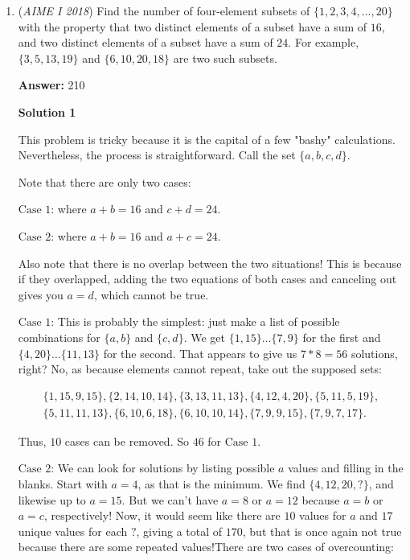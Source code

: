 \begin{enumerate}
 Solving this equation gives $d=7\sqrt{3}$, and $d^2=\boxed{147}$



	\item (\textit{AIME I 2018}) Find the number of four-element subsets of $\{1,2,3,4,\dots, 20\}$ with the property that two distinct elements of a subset have a sum of $16$, and two distinct elements of a subset have a sum of $24$. For example, $\{3,5,13,19\}$ and $\{6,10,20,18\}$ are two such subsets.


 
 \textbf{Answer: }210



\textbf{Solution 1}

This problem is tricky because it is the capital of a few "bashy" calculations. Nevertheless, the process is straightforward. Call the set $\{a, b, c, d\}$.

 Note that there are only two cases:

 $\textrm{Case } 1 \textrm{:}$ where $a + b = 16$ and $c + d = 24$.

 $\textrm{Case } 2 \textrm{:}$ where $a + b = 16$ and $a + c = 24$.

 Also note that there is no overlap between the two situations! This is because if they overlapped, adding the two equations of both cases and canceling out gives you $a=d$, which cannot be true.

 $\textrm{Case } 1 \textrm{:}$ This is probably the simplest: just make a list of possible combinations for $\{a, b\}$ and $\{c, d\}$. We get $\{1, 15\}\dots\{7, 9\}$ for the first and $\{4, 20\}\dots\{11, 13\}$ for the second. That appears to give us $7*8=56$ solutions, right? No, as because elements cannot repeat, take out the supposed sets:

 
 \[\begin{array}{l} \{1,15,9,15\}, \{2,14,10,14\}, \{3,13,11,13\}, \{4,12,4,20\}, \{5,11,5,19\},\\ \{5,11,11,13\}, \{6,10,6,18\}, \{6,10,10,14\}, \{7,9,9,15\}, \{7,9,7,17\}. \end{array}\]

 Thus, $10$ cases can be removed. So $46$ for $\textrm{Case } 1$.

 $\textrm{Case } 2 \textrm{:}$ We can look for solutions by listing possible $a$ values and filling in the blanks. Start with $a=4$, as that is the minimum. We find $\{4, 12, 20, ?\}$, and likewise up to $a=15$. But we can't have $a=8$ or $a=12$ because $a=b$ or $a=c$, respectively! Now, it would seem like there are $10$ values for $a$ and $17$ unique values for each $?$, giving a total of $170$, but that is once again not true because there are some repeated values!There are two cases of overcounting:


\end{enumerate}
